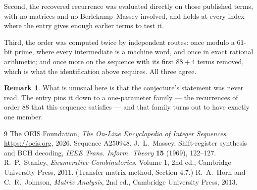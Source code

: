 \documentclass[11pt,a4paper]{article}
\theoremstyle{plain}
\theoremstyle{definition}
\newtheorem{remark}[theorem]{Remark}
\begin{document}
Second, the recovered recurrence was evaluated directly on those published terms, with no
matrices and no Berlekamp--Massey involved, and holds at every index where the entry gives
enough earlier terms to test it.

Third, the order was computed twice by independent routes: once modulo a $61$-bit prime, where
every intermediate is a machine word, and once in exact rational arithmetic; and once more on
the sequence with its first $88+4$ terms removed, which is what the identification above
requires. All three agree.

\begin{remark}
What is unusual here is that the conjecture's statement was never read. The entry pins it down
to a one-parameter family --- the recurrences of order $88$ that this sequence satisfies
--- and that family turns out to have exactly one member.
\end{remark}

\begin{thebibliography}{9}
 The OEIS Foundation, \emph{The On-Line Encyclopedia of Integer
Sequences}, \url{https://oeis.org}, 2026. Sequence A250948.
 J.~L.~Massey, Shift-register synthesis and BCH decoding, \emph{IEEE
Trans. Inform. Theory} \textbf{15} (1969), 122--127.
 R.~P.~Stanley, \emph{Enumerative Combinatorics}, Volume 1, 2nd ed.,
Cambridge University Press, 2011. (Transfer-matrix method, Section 4.7.)
 R.~A.~Horn and C.~R.~Johnson, \emph{Matrix Analysis}, 2nd ed., Cambridge
University Press, 2013.
\end{thebibliography}
\end{document}
